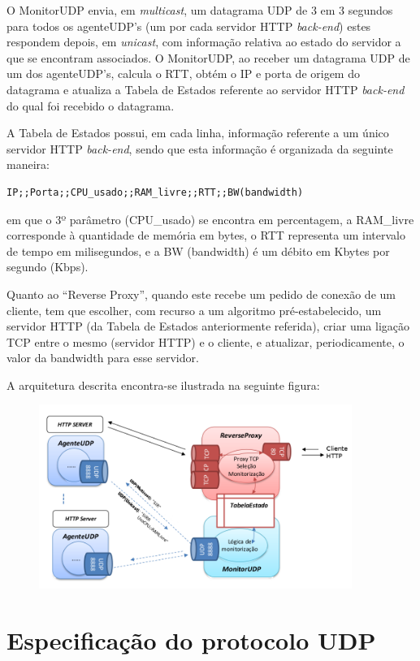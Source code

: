 \documentclass{article}
\begin{document}
O MonitorUDP envia, em \textit{multicast}, um datagrama UDP de 3 em 3 segundos para todos os agenteUDP's (um por cada servidor HTTP \textit{back-end}) estes respondem depois, em \textit{unicast}, com informação relativa ao estado do servidor a que se encontram associados. O MonitorUDP, ao receber um datagrama UDP de um dos agenteUDP's, calcula o RTT, obtém o IP e porta de origem do datagrama e atualiza a Tabela de Estados referente ao servidor HTTP \textit{back-end} do qual foi recebido o datagrama.

A Tabela de Estados possui, em cada linha, informação referente a um único servidor HTTP \textit{back-end}, sendo que esta informação é organizada da seguinte maneira:

\begin{verbatim}
IP;;Porta;;CPU_usado;;RAM_livre;;RTT;;BW(bandwidth)
\end{verbatim}
em que o 3º parâmetro (CPU\_usado) se encontra em percentagem, a RAM\_livre corresponde à quantidade de memória em bytes, o RTT representa um intervalo de tempo em milisegundos, e a BW (bandwidth) é um débito em Kbytes por segundo (Kbps).

Quanto ao ``Reverse Proxy'', quando este recebe um pedido de conexão de um cliente, tem que escolher, com recurso a um algoritmo pré-estabelecido,  um servidor HTTP (da Tabela de Estados anteriormente referida), criar uma ligação TCP entre o mesmo (servidor HTTP) e o cliente, e atualizar, periodicamente, o valor da bandwidth para esse servidor.

A arquitetura descrita encontra-se ilustrada na seguinte figura:
\begin{figure}[H]
	\centering
	\includegraphics[height=6cm]{arquitetura.png}
\end{figure}

\section{Especificação do protocolo UDP}
\end{document}
